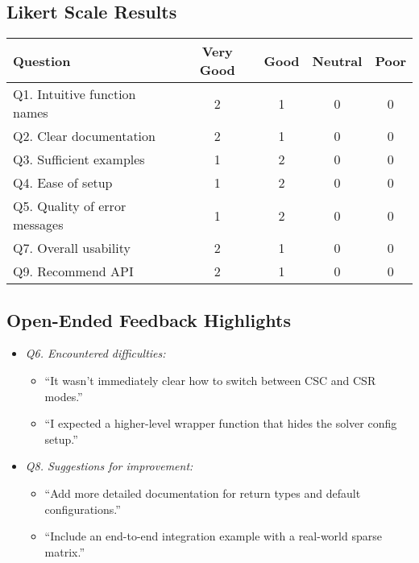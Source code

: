 \documentclass[12pt, titlepage]{article}
\begin{document}
\subsection{Likert Scale Results}

\begin{tabularx}{\linewidth}{lcccc}
  \toprule
  \textbf{Question}                   & \textbf{Very Good} & \textbf{Good} & \textbf{Neutral} & \textbf{Poor} \\
  \midrule
  Q1. Intuitive function names  & 2            & 1       & 0          & 0       \\
  Q2. Clear documentation       & 2            & 1       & 0          & 0       \\
  Q3. Sufficient examples       & 1            & 2       & 0          & 0       \\
  Q4. Ease of setup             & 1            & 2       & 0          & 0       \\
  Q5. Quality of error messages & 1            & 2       & 0          & 0       \\
  Q7. Overall usability         & 2            & 1       & 0          & 0       \\
  Q9. Recommend API             & 2            & 1       & 0          & 0       \\
  \bottomrule
\end{tabularx}

\subsection{Open-Ended Feedback Highlights}

\begin{itemize}
  \item \textit{Q6. Encountered difficulties:}
  \begin{itemize}
    \item “It wasn't immediately clear how to switch between CSC and CSR modes.”
    \item “I expected a higher-level wrapper function that hides the solver config setup.”
  \end{itemize}
  \item \textit{Q8. Suggestions for improvement:}
  \begin{itemize}
    \item “Add more detailed documentation for return types and default configurations.”
    \item “Include an end-to-end integration example with a real-world sparse matrix.”
  \end{itemize}
\end{itemize}
\end{document}

